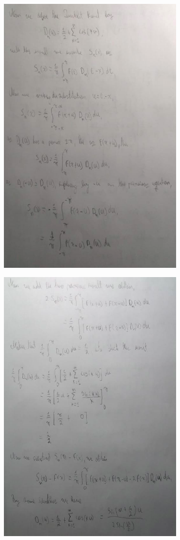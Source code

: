 \documentclass{article}
\begin{document}
\begin{center}
	\includegraphics[width=0.7\textwidth]{img/2-1-3.png}
\end{center}
\begin{center}
	\includegraphics[width=0.7\textwidth]{img/2-1-4.png}
\end{center}
\end{document}
